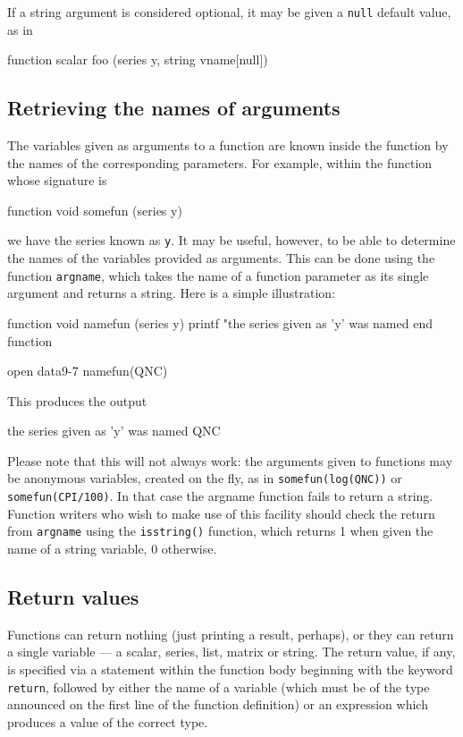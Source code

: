 If a string argument is considered optional, it may be given a
\texttt{null} default value, as in
%
\begin{code}
function scalar foo (series y, string vname[null])
\end{code}

\subsection{Retrieving the names of arguments}

The variables given as arguments to a function are known inside the
function by the names of the corresponding parameters.  For example,
within the function whose signature is
%
\begin{code}
function void somefun (series y)
\end{code}
%
we have the series known as \texttt{y}.  It may be useful, however, to
be able to determine the names of the variables provided as arguments.
This can be done using the function \texttt{argname}, which takes the
name of a function parameter as its single argument and returns a
string.  Here is a simple illustration:
%
\begin{code}
function void namefun (series y)
  printf "the series given as 'y' was named %
end function

open data9-7
namefun(QNC)
\end{code}
%
This produces the output
%
\begin{code}
the series given as 'y' was named QNC
\end{code}

Please note that this will not always work: the arguments given
to functions may be anonymous variables, created on the fly, as in
\texttt{somefun(log(QNC))} or \texttt{somefun(CPI/100)}.  In that case
the \textsf{argname} function fails to return a string.  Function
writers who wish to make use of this facility should check the return
from \texttt{argname} using the \texttt{isstring()} function, which
returns 1 when given the name of a string variable, 0 otherwise.

\subsection{Return values}

Functions can return nothing (just printing a result, perhaps), or
they can return a single variable --- a scalar, series, list, matrix
or string.  The return value, if any, is specified via a statement
within the function body beginning with the keyword \texttt{return},
followed by either the name of a variable (which must be of the type
announced on the first line of the function definition) or an
expression which produces a value of the correct type.

